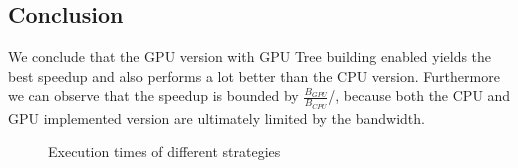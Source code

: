 \documentclass[]{article}
\begin{document}
\begin{comment}
This yields in a speed-up of:
\pgfmathsetmacro\speedup{\cpuSummit / \gpuSummitT}
\begin{center}
	\begin{equation}
		\frac{\cpuSummit s}{\gpuSummitT s} = \speedup \times
	\end{equation}
\end{center}


\vspace{5mm}


\subsection{Eiger}

\pgfmathsetmacro\cpuEiger{ln(1024) / ln(2) * (\p * \s / (204.8 * 2)}

\begin{center}
	\begin{equation}
		\log(1024) \times \p \times \frac{ \s GB }{204.8 GB/s \times 2} = \cpuEiger s
	\end{equation}
\end{center}

\end{comment}

\subsection{Conclusion}

We conclude that the GPU version with GPU Tree building enabled yields the best speedup and also performs a lot better than the CPU version. Furthermore we can observe that the speedup is bounded by $\frac{B_{GPU}}{B_{CPU}}$/, because both the CPU and GPU implemented version are ultimately limited by the bandwidth.

\begin{figure}[H]
	\begin{center}
	\end{center}

\caption{Execution times of different strategies}
\label{fig:exectimes}
\end{figure}
\end{document}
